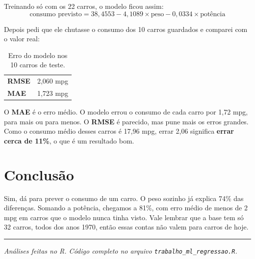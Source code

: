 \documentclass[11pt,a4paper]{article}
\begin{document}
Treinando só com os 22 carros, o modelo ficou assim:
\[
\text{consumo previsto} = 38{,}4553 - 4{,}1089 \times \text{peso} - 0{,}0334 \times \text{potência}
\]

Depois pedi que ele chutasse o consumo dos 10 carros guardados e comparei com o valor real:

\begin{table}[H]
\centering
\caption{Erro do modelo nos 10 carros de teste.}
\small
\begin{tabular}{lc}
\toprule
\textbf{RMSE} & 2,060 mpg \\
\textbf{MAE} & 1,723 mpg \\
\bottomrule
\end{tabular}
\end{table}

O \textbf{MAE} é o erro médio. O modelo errou o consumo de cada carro por 1,72 mpg, para mais ou para menos. O \textbf{RMSE} é parecido, mas pune mais os erros grandes. Como o consumo médio desses carros é 17,96 mpg, errar 2,06 significa \textbf{errar cerca de 11\%}, o que é um resultado bom.

\section{Conclusão}

Sim, dá para prever o consumo de um carro. O peso sozinho já explica 74\% das diferenças. Somando a potência, chegamos a 81\%, com erro médio de menos de 2 mpg em carros que o modelo nunca tinha visto. Vale lembrar que a base tem só 32 carros, todos dos anos 1970, então essas contas não valem para carros de hoje.

\vspace{4pt}\hrule\vspace{3pt}
{\footnotesize\textit{Análises feitas no R. Código completo no arquivo \texttt{trabalho\_ml\_regressao.R}.}}
\end{document}
